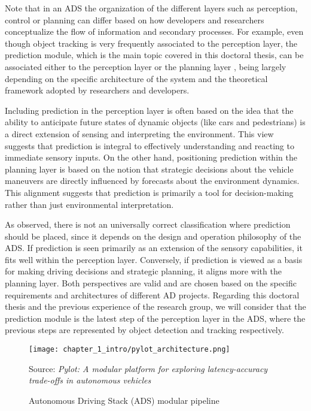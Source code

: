Note that in an \ac{ADS} the organization of the different layers such as perception, control or planning can differ based on how developers and researchers conceptualize the flow of information and secondary processes. For example, even though object tracking is very frequently associated to the perception layer, the prediction module, which is the main topic covered in this doctoral thesis, can be associated either to the perception layer \cite{yurtsever2020survey} \cite{schwarting2018planning} \cite{paden2016survey} or the planning layer \cite{cunningham2015mpdm} \cite{werling2010optimal}, being largely depending on the specific architecture of the system and the theoretical framework adopted by researchers and developers. 

Including prediction in the perception layer is often based on the idea that the ability to anticipate future states of dynamic objects (like cars and pedestrians) is a direct extension of sensing and interpreting the environment. This view suggests that prediction is integral to effectively understanding and reacting to immediate sensory inputs. On the other hand, positioning prediction within the planning layer is based on the notion that strategic decisions about the vehicle maneuvers are directly influenced by forecasts about the environment dynamics. This alignment suggests that prediction is primarily a tool for decision-making rather than just environmental interpretation.

As observed, there is not an universally correct classification where prediction should be placed, since it depends on the design and operation philosophy of the \ac{ADS}. If prediction is seen primarily as an extension of the sensory capabilities, it fits well within the perception layer. Conversely, if prediction is viewed as a basis for making driving decisions and strategic planning, it aligns more with the planning layer. Both perspectives are valid and are chosen based on the specific requirements and architectures of different \ac{AD} projects. Regarding this doctoral thesis and the previous experience of the research group, we will consider that the prediction module is the latest step of the perception layer in the \ac{ADS}, where the previous steps are represented by object detection and tracking respectively.

\begin{figure}[h]
	\centering
	\texttt{[image: chapter\_1\_intro/pylot\_architecture.png]}
	\caption{Autonomous Driving Stack (ADS) modular pipeline}
	Source: \textit{Pylot: A modular platform for exploring latency-accuracy trade-offs in autonomous vehicles} \cite{gog2021pylot}
	\label{fig:chapter_1_intro/pylot_architecture}
\end{figure}

